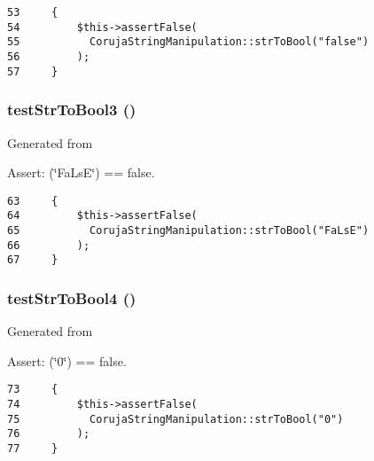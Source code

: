 \begin{Code}\begin{verbatim}53     {
54         $this->assertFalse(
55           CorujaStringManipulation::strToBool("false")
56         );
57     }
\end{verbatim}
\end{Code}


\hypertarget{class_coruja_string_manipulation_test_dc99487f3aea88d98e3d7c6ce24130e4}{
\subsubsection[{testStrToBool3}]{\setlength{\rightskip}{0pt plus 5cm}testStrToBool3 ()}}
\label{class_coruja_string_manipulation_test_dc99487f3aea88d98e3d7c6ce24130e4}


Generated from \begin{Desc}
\item[Assert:](\char`\"{}FaLsE\char`\"{}) == false. \end{Desc}


\begin{Code}\begin{verbatim}63     {
64         $this->assertFalse(
65           CorujaStringManipulation::strToBool("FaLsE")
66         );
67     }
\end{verbatim}
\end{Code}


\hypertarget{class_coruja_string_manipulation_test_1e5d231a226f2fdf80ea7f4318362477}{
\subsubsection[{testStrToBool4}]{\setlength{\rightskip}{0pt plus 5cm}testStrToBool4 ()}}
\label{class_coruja_string_manipulation_test_1e5d231a226f2fdf80ea7f4318362477}


Generated from \begin{Desc}
\item[Assert:](\char`\"{}0\char`\"{}) == false. \end{Desc}


\begin{Code}\begin{verbatim}73     {
74         $this->assertFalse(
75           CorujaStringManipulation::strToBool("0")
76         );
77     }
\end{verbatim}
\end{Code}


